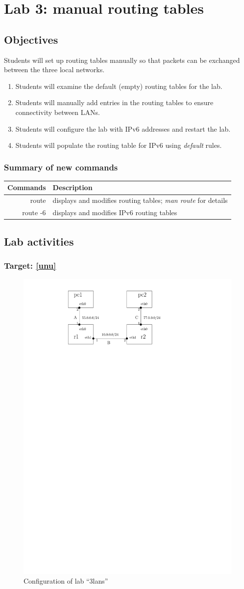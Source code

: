 \documentclass[12pt]{book}
\newcommand{\inspdf}[3]{
\begin{figure}[tb]
\begin{center}
\includegraphics[page=#1, scale=#2]{figs-manual/figs.pdf}
\end{center}
        \caption{#3}\label{f-#1}
\end{figure}
}
\begin{document}
\chapter{Lab 3: manual routing tables}

\section{Objectives}

Students will set up routing tables manually so that packets can be exchanged between the three local networks.

\begin{enumerate}[label=Objective \arabic*:]
\item\label{unu} Students will examine the default (empty) routing tables for the lab.
\item\label{addroute} Students will manually add entries in the routing tables to ensure connectivity between LANs.
\item\label{addipv6} Students will configure the lab with IPv6 addresses and restart the lab.
\item\label{ipv6route} Students will populate the routing table for IPv6 using \emph{default} rules. 
\end{enumerate}


\subsection{Summary of new commands}

\begin{tabularx}{\textwidth}{r  X}
  Commands & Description \\ \midrule
  route & displays and modifies routing tables; \emph{man route} for details \\
  route -6 & displays and modifies IPv6 routing tables\\
\end{tabularx}


\section{Lab activities}

\subsection{Target: \ref{unu}}

\inspdf{1}{1}{Configuration of lab ``3lans''}
\end{document}
